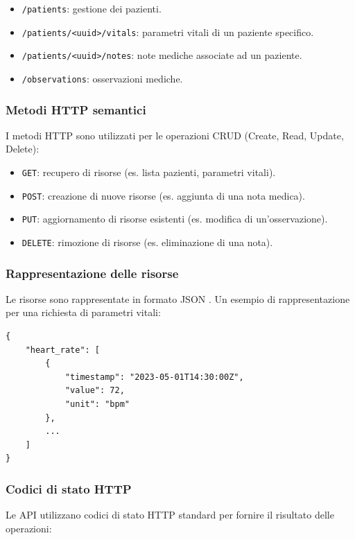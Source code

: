 \documentclass[12pt,a4paper,oneside]{report}
\begin{document}
\begin{itemize}
    \item \texttt{/patients}: gestione dei pazienti.
    \item \texttt{/patients/<uuid>/vitals}: parametri vitali di un paziente specifico.
  \item \texttt{/patients/<uuid>/notes}: note mediche associate ad un paziente.
    \item \texttt{/observations}: osservazioni mediche.
\end{itemize}

\subsubsection{Metodi HTTP semantici}
I metodi HTTP sono utilizzati per le operazioni CRUD (Create, Read, Update, Delete):

\begin{itemize}
    \item \texttt{GET}: recupero di risorse (es. lista pazienti, parametri vitali).
    \item \texttt{POST}: creazione di nuove risorse (es. aggiunta di una nota medica).
    \item \texttt{PUT}: aggiornamento di risorse esistenti (es. modifica di un'osservazione).
    \item \texttt{DELETE}: rimozione di risorse (es. eliminazione di una nota).
\end{itemize}

\subsubsection{Rappresentazione delle risorse}
Le risorse sono rappresentate in formato JSON \cite{json}.
Un esempio di rappresentazione per una richiesta di parametri vitali:

\begin{verbatim}
{
    "heart_rate": [
        {
            "timestamp": "2023-05-01T14:30:00Z",
            "value": 72,
            "unit": "bpm"
        },
        ...
    ]
}
\end{verbatim}

\subsubsection{Codici di stato HTTP}
Le API utilizzano codici di stato HTTP standard per fornire il risultato delle operazioni:
\end{document}
